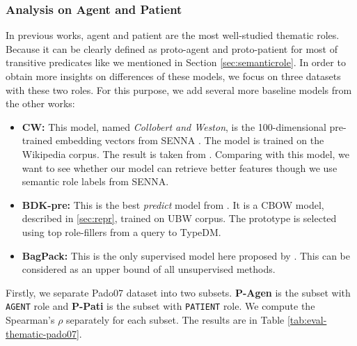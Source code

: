 \documentclass[a4paper]{article}
\begin{document}
\subsubsection{Analysis on Agent and Patient} \label{sec:result-thematic-ap}
In previous works, agent and patient are the most well-studied thematic roles. Because it can be clearly defined as proto-agent and proto-patient for most of transitive predicates like we mentioned in Section \ref{sec:semanticrole}. In order to obtain more insights on differences of these models, we focus on three datasets with these two roles. 
For this purpose, we add several more baseline models from the other works: 
\begin{itemize}
  \item \textbf{CW: }       This model, named \textit{Collobert and Weston}, is the 100-dimensional pre-trained embedding vectors from SENNA \citep{collobert2011natural}. The model is trained on the Wikipedia corpus. The result is taken from \citet{baroni2014don}. Comparing with this model, we want to see whether our model can retrieve better features though we use semantic role labels from SENNA. 
  \item \textbf{BDK-pre: }  This is the best \textit{predict} model from \citet{baroni2014don}. It is a CBOW model, described in \ref{sec:repr}, trained on UBW corpus. The prototype is selected using top role-fillers from a query to TypeDM. 
  \item \textbf{BagPack: }  This is the only supervised model here proposed by \citet{herdagdelen2009bagpack}. This can be considered as an upper bound of all unsupervised methods. 
\end{itemize}
Firstly, we separate Pado07 dataset into two subsets. \textbf{P-Agen} is the subset with \texttt{AGENT} role and \textbf{P-Pati} is the subset with \texttt{PATIENT} role. We compute the Spearman's $\rho$ separately for each subset. The results are in Table \ref{tab:eval-thematic-pado07}. 
\end{document}
